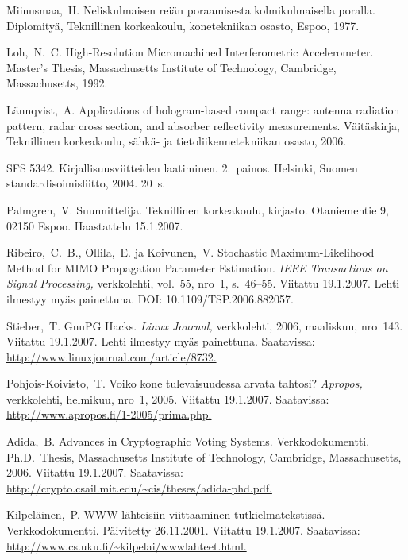 \documentclass[english,12pt,a4paper,pdftex]{article}
\begin{document}
\begin{thebibliography}{99}
 Miinusmaa,\ H. Neliskulmaisen reiän poraamisesta
  kolmikulmaisella poralla. Diplomityä, Teknillinen korkeakoulu,
  konetekniikan osasto, Espoo, 1977.

 Loh,\ N.\ C. High-Resolution Micromachined
  Interferometric Accelerometer. Master's Thesis, Massachusetts
  Institute of Technology, Cambridge,
  \foreignlanguage{english}{Massachusetts,} 1992.

 Lännqvist,\ A.
  \foreignlanguage{english}{Applications of hologram-based compact
    range: antenna radiation pattern, radar cross section, and
    absorber reflectivity measurements.} Väitäskirja, Teknillinen
  korkeakoulu, sähkä- ja tietoliikennetekniikan osasto, 2006.

 SFS 5342. Kirjallisuusviitteiden laatiminen. 2.\ painos.
  Helsinki, Suomen standardisoimisliitto, 2004. 20~s.

 Palmgren,\ V. Suunnittelija. Teknillinen
  korkeakoulu, kirjasto. Otaniementie 9, 02150 Espoo. Haastattelu
  15.1.2007.

 Ribeiro,\ C.\ B., Ollila,\ E. ja Koivunen,\ V.
  \foreignlanguage{english}{Stochastic Maximum-Likelihood Method for
    MIMO Propagation Parameter Estimation.} \textit{IEEE Transactions
    on Signal Processing,} verkkolehti, vol.\ 55, nro~1, s.\ 46--55.
  Viitattu 19.1.2007. Lehti ilmestyy myäs painettuna. DOI:
  10.1109/TSP.2006.882057.

 Stieber,\ T. GnuPG Hacks. \textit{Linux Journal,}
  verkkolehti, 2006, maaliskuu, nro~143. Viitattu 19.1.2007. Lehti
  ilmestyy myäs painettuna. Saatavissa:
  \url{http://www.linuxjournal.com/article/8732.}

 Pohjois-Koivisto,\ T. Voiko kone tulevaisuudessa arvata
  tahtosi?  \textit{Apropos,} verkkolehti, helmikuu, nro~1, 2005.
  Viitattu 19.1.2007.  Saatavissa:
  \url{http://www.apropos.fi/1-2005/prima.php.}

 Adida,\ B.  Advances in Cryptographic Voting Systems.
  Verkkodokumentti. Ph.D.\ Thesis, Massachusetts Institute of
  Technology, Cambridge, \foreignlanguage{english}{Massachusetts,}
  2006. Viitattu 19.1.2007.  Saatavissa:
  \url{http://crypto.csail.mit.edu/~cis/theses/adida-phd.pdf.}

 Kilpeläinen,\ P. WWW-lähteisiin viittaaminen
  tutkielmatekstissä. Verkkodokumentti. Päivitetty 26.11.2001.
  Viitattu 19.1.2007. Saatavissa:
  \url{http://www.cs.uku.fi/~kilpelai/wwwlahteet.html.}

\end{thebibliography}
\end{document}
